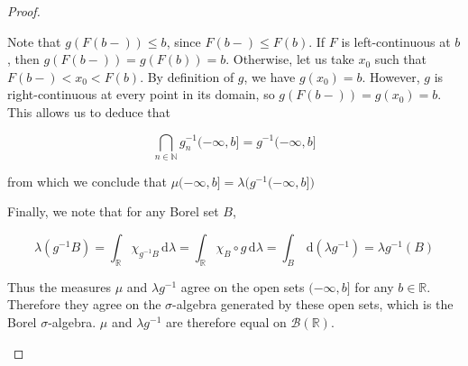 \documentclass[11pt,a4paper,twoside]{article}
\begin{document}
\begin{proof}
\begin{enumerate}
    Note that $g ( F (b-) ) \leq b$, since $F (b-) \leq F (b)$. If $F$
    is left-continuous at $b$, then $g ( F (b-) ) = g ( F (b) ) =
    b$. Otherwise, let us take $x_0$ such that $F (b-) < x_0 < F
    (b)$. By definition of $g$, we have $g (x_0) = b$. However, $g$ is
    right-continuous at every point in its domain, so $g ( F (b-) ) =
    g (x_0) = b$. This allows us to deduce that

    \[
    \bigcap_{n \in \mathbb{N}} g_n^{-1} (-\infty, b] = g^{-1}
      (-\infty, b]
    \]

    from which we conclude that $\mu (-\infty, b] = \lambda \big(
    g^{-1} (-\infty, b] \big)$

    Finally, we note that for any Borel set $B$,

    \[
    \lambda ( g^{-1} B ) = \int_\mathbb{R} \chi_{g^{-1} B} \,\mathrm{d}\lambda
    = \int_\mathbb{R} \chi_B \circ g \,\mathrm{d}\lambda = \int_B
    \,\mathrm{d} (\lambda g^{-1})
    = \lambda g^{-1} (B)
    \]

    Thus the measures $\mu$ and $\lambda g^{-1}$ agree on the open
    sets $(-\infty, b]$ for any $b \in \mathbb{R}$. Therefore they
    agree on the $\sigma$-algebra generated by these open sets, which
    is the Borel $\sigma$-algebra. $\mu$ and $\lambda g^{-1}$ are
    therefore equal on $\mathscr{B} ( \mathbb{R} )$.

  \end{enumerate}
\end{proof}
\end{document}
